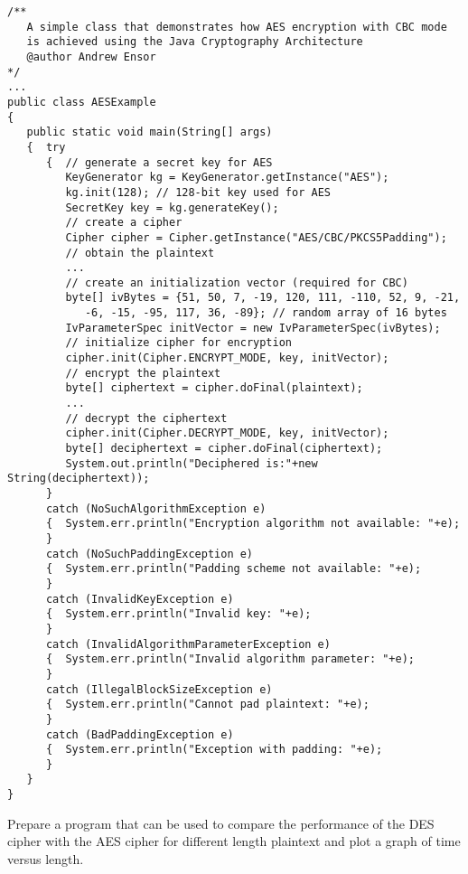 \begin{figure*}\begin{program}\begin{verbatim}
/**
   A simple class that demonstrates how AES encryption with CBC mode
   is achieved using the Java Cryptography Architecture
   @author Andrew Ensor
*/
...
public class AESExample
{
   public static void main(String[] args)
   {  try
      {  // generate a secret key for AES
         KeyGenerator kg = KeyGenerator.getInstance("AES");
         kg.init(128); // 128-bit key used for AES
         SecretKey key = kg.generateKey();
         // create a cipher
         Cipher cipher = Cipher.getInstance("AES/CBC/PKCS5Padding");
         // obtain the plaintext
         ...
         // create an initialization vector (required for CBC)
         byte[] ivBytes = {51, 50, 7, -19, 120, 111, -110, 52, 9, -21,
            -6, -15, -95, 117, 36, -89}; // random array of 16 bytes
         IvParameterSpec initVector = new IvParameterSpec(ivBytes);
         // initialize cipher for encryption
         cipher.init(Cipher.ENCRYPT_MODE, key, initVector);
         // encrypt the plaintext
         byte[] ciphertext = cipher.doFinal(plaintext);
         ...
         // decrypt the ciphertext
         cipher.init(Cipher.DECRYPT_MODE, key, initVector);
         byte[] deciphertext = cipher.doFinal(ciphertext);
         System.out.println("Deciphered is:"+new String(deciphertext));
      }
      catch (NoSuchAlgorithmException e)
      {  System.err.println("Encryption algorithm not available: "+e);
      }
      catch (NoSuchPaddingException e)
      {  System.err.println("Padding scheme not available: "+e);
      }
      catch (InvalidKeyException e)
      {  System.err.println("Invalid key: "+e);
      }
      catch (InvalidAlgorithmParameterException e)
      {  System.err.println("Invalid algorithm parameter: "+e);
      }
      catch (IllegalBlockSizeException e)
      {  System.err.println("Cannot pad plaintext: "+e);
      }
      catch (BadPaddingException e)
      {  System.err.println("Exception with padding: "+e);
      }
   }
}
\end{verbatim}\end{program}\end{figure*}


\begin{exercise}
Prepare a program that can be used to compare the performance of the DES cipher
with the AES cipher for different length plaintext and plot a graph of
time versus length.
\end{exercise}


